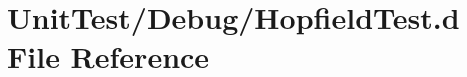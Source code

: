 \hypertarget{_hopfield_test_8d}{\section{Unit\+Test/\+Debug/\+Hopfield\+Test.d File Reference}
\label{_hopfield_test_8d}
}
